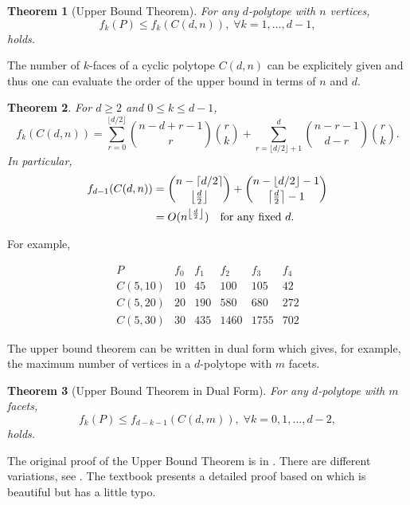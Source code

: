 \documentclass[a4paper,12pt]{article}
\newtheorem{theorem}{Theorem}
\newcommand{\FL}[1]{\left\lfloor #1  \right\rfloor}
\newcommand{\RF}[1]{\left\lceil #1  \right\rceil}
\begin{document}
\begin{theorem} [Upper Bound Theorem] \label{thm:MUB}
For any $d$-polytope with $n$ vertices,  
\[
  f_k(P)  \le f_{k}(C(d,n)),  \; \forall k=1, \ldots, d-1,
\]
holds.
\end{theorem}

The number of $k$-faces of a cyclic polytope $C(d,n)$ can
be explicitely given and thus one can evaluate the order of
the upper bound in terms of $n$ and $d$.

\begin{theorem} \label{thm:Cyclic}
For $d \ge 2$ and $0 \le k \le d-1$,
\[
 f_{k}(C(d,n)) = \sum_{r=0}^{\lfloor d/2 \rfloor}
\binom{n-d+r-1}{r} \binom{r}{k}
+
\sum_{r=\lfloor d/2 \rfloor+1}^{d}
\binom{n-r-1}{d-r} \binom{r}{k} .
\]  In particular,
\begin{align} \label{polytope:FacetUB}
 f_{d-1}(C(d,n))  
  &= \binom{n-\RF{d/2}}{\left\lfloor \frac{d}{2} \right\rfloor} + \binom{n-\FL{d/2}-1}{\left\lceil \frac{d}{2} \right\rceil -1}\\
   & = O(n^{\left\lfloor \frac{d}{2} \right\rfloor}) \text{\quad for any fixed $d$}.
\end{align}
\end{theorem}


\noindent
For example,

\[
\begin{array}{lrrrrr}
P       & f_0 &  f_1 & f_2 &  f_3 & f_4 \\  
C(5,10) &  10  &  45 &   100 &   105  &  42\\
C(5,20) &  20  & 190 &   580 &   680  & 272\\
C(5,30) &  30  & 435 &  1460 &  1755  & 702
\end{array}
\]

The upper bound theorem can be written in dual  form which
gives, for example, the maximum number of vertices in
a $d$-polytope with $m$ facets.

\begin{theorem} [Upper Bound Theorem in Dual Form] \label{thm:MUBDual}
For any $d$-polytope with $m$ facets,  
\[
  f_k(P)  \le f_{d-k-1}(C(d,m)),  \; \forall k=0,1, \ldots, d-2,
\]
holds.
\end{theorem}


The original proof of the Upper Bound Theorem is in
\cite{m-mnfcp-70,ms-cpuc-71}.
There are different variations, 
see \cite{k-lpsasp-97,m-cg-94,z-lop-94}.  The textbook \cite[Chap 6]{f-pc-20} 
presents a detailed proof based on \cite{k-lpsasp-97} which is beautiful 
but has a little typo.
\end{document}
